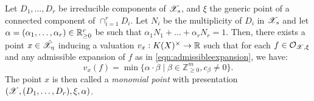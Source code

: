 \begin{prop}\label{monomialpoint} \parencite[Prop. 2.4.6]{MN}
    Let $D_1, \dots, D_r$ be irreducible components of $\mathscr{X}_s$, and $\xi$ the generic point of a connected component of $\cap_{i = 1}^{r} D_i$.
    Let $N_i$ be the multiplicity of $D_i$ in $\mathscr{X}_s$ and let $\alpha = (\alpha_1, \dots, \alpha_r) \in \mathbb{R}^{r}_{\geq 0}$ be such that $\alpha_1 N_1 + \dots + \alpha_r N_r = 1$.
    Then, there exists a point $x \in \hat{\mathscr{X}}_{\eta}$ inducing a valuation $v_{x}: K(X)^{\times} \to \mathbb{R}$ such that for each $f \in \mathcal{O}_{\mathscr{X}, \xi}$ and any admissible expansion of $f$ as in \cref{eqn:admissibleexpansion}, we have:
    \[
        v_{x}(f) = \min \{ \alpha \cdot \beta \; \vert \; \beta \in \mathbb{Z}_{\geq 0}^m, c_{\beta} \neq 0\}.
    \]
     The point $x$ is then called a \textit{monomial point} with presentation $(\mathscr{X}, (D_1, \dots, D_r), \xi, \alpha)$.
\end{prop}
